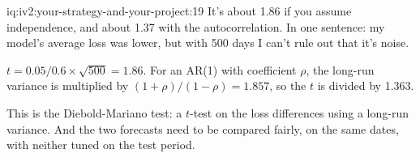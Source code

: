 \begin{solution}{iq:iv2:your-strategy-and-your-project:19}
It's about 1.86 if you assume independence, and about 1.37 with the autocorrelation. In one sentence: my model's average loss was lower, but with 500 days I can't rule out that it's noise.

$t = 0.05/0.6 \times \sqrt{500} = 1.86$. For an AR(1) with coefficient $\rho$, the long-run variance is multiplied by $(1 + \rho)/(1 - \rho) = 1.857$, so the $t$ is divided by 1.363.

This is the Diebold-Mariano test: a $t$-test on the loss differences using a long-run variance. And the two forecasts need to be compared fairly, on the same dates, with neither tuned on the test period.

\end{solution}

